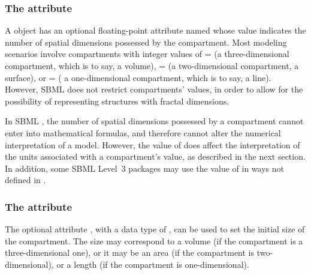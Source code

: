 \subsubsection{The  attribute}

A \Compartment object has an optional floating-point attribute
named  whose value indicates the number
of spatial dimensions possessed by the compartment.  Most modeling
scenarios involve compartments with integer values of
= (\ie a three-dimensional
compartment, which is to say, a volume),
= (\ie a two-dimensional
compartment, a surface), or = (\ie
a one-dimensional compartment, which is to say, a line).  However,
SBML \thisL does not restrict compartments'
 values, in order to allow for the
possibility of representing structures with fractal dimensions.

In SBML \thisLV, the number of spatial dimensions possessed by a
compartment cannot enter into mathematical formulas, and therefore
cannot alter the numerical interpretation of a model.  However, the
value of  does affect the interpretation
of the units associated with a compartment's  value,
as described in the next section.  In addition, some SBML Level~3
packages may use the value of  in ways
not defined in \thisLV.


\subsubsection{The  attribute}
\label{sec:size}

The optional \Compartment attribute , with a data type
of , can be used to set the initial size of the
compartment.  The size may correspond to a volume (if the
compartment is a three-dimensional one), or it may be an area (if
the compartment is two-dimensional), or a length (if the
compartment is one-dimensional).


